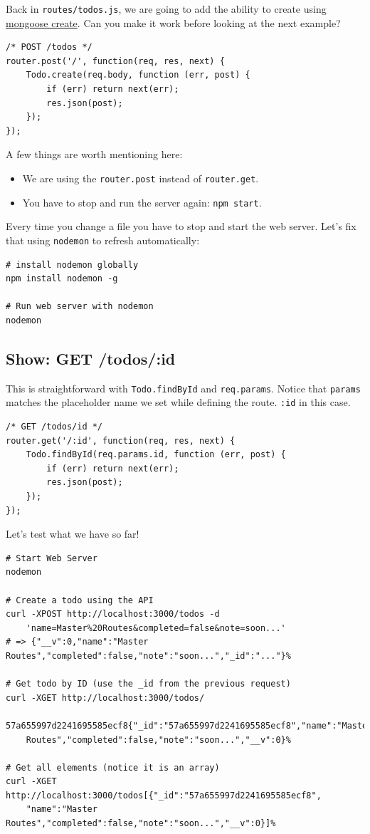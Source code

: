 \documentclass[12pt]{article}
\begin{document}
Back in \texttt{routes/todos.js}, we are going to add the ability to
create using \protect\hyperlink{mongoose-create}{mongoose create}. Can
you make it work before looking at the next example?
\begin{Verbatim}
/* POST /todos */
router.post('/', function(req, res, next) {  
	Todo.create(req.body, function (err, post) {    
		if (err) return next(err);    
		res.json(post);  
	});
});
\end{Verbatim}
A few things are worth mentioning here:
\begin{itemize}
\item
  We are using the \texttt{router.post} instead of \texttt{router.get}.
\item
  You have to stop and run the server again: \texttt{npm\ start}.
\end{itemize}
Every time you change a file you have to stop and start the web server.
Let's fix that using \texttt{nodemon} to refresh automatically:
\begin{Verbatim}
# install nodemon globally
npm install nodemon -g

# Run web server with nodemon
nodemon
\end{Verbatim}

\subsection{Show: GET /todos/:id}

This is straightforward with
\texttt{Todo.findById} and
\texttt{req.params}. Notice that \texttt{params} matches the placeholder
name we set while defining the route. \texttt{:id} in this case.
\begin{Verbatim}
/* GET /todos/id */
router.get('/:id', function(req, res, next) {  
	Todo.findById(req.params.id, function (err, post) {    
		if (err) return next(err);    
		res.json(post);  
	});
});
\end{Verbatim}
Let's test what we have so far!
\begin{Verbatim}
# Start Web Server
nodemon

# Create a todo using the API
curl -XPOST http://localhost:3000/todos -d 
	'name=Master%20Routes&completed=false&note=soon...'
# => {"__v":0,"name":"Master Routes","completed":false,"note":"soon...","_id":"..."}%

# Get todo by ID (use the _id from the previous request)
curl -XGET http://localhost:3000/todos/
	57a655997d2241695585ecf8{"_id":"57a655997d2241695585ecf8","name":"Master 
	Routes","completed":false,"note":"soon...","__v":0}%

# Get all elements (notice it is an array)
curl -XGET http://localhost:3000/todos[{"_id":"57a655997d2241695585ecf8",
	"name":"Master Routes","completed":false,"note":"soon...","__v":0}]%
\end{Verbatim}
\end{document}
